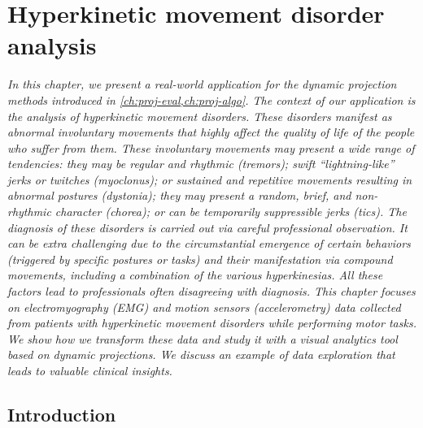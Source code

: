 \chapter{Hyperkinetic movement disorder analysis}
\label{ch:nemo}

\textit{
In this chapter, we present a real-world application for the dynamic projection methods introduced in \cref{ch:proj-eval,ch:proj-algo}. The context of our application is the analysis of hyperkinetic movement disorders. These disorders manifest as abnormal involuntary movements that highly affect the quality of life of the people who suffer from them. These involuntary movements may present a wide range of tendencies: they may be regular and rhythmic (tremors); swift ``lightning-like'' jerks or twitches (myoclonus); or sustained and repetitive movements resulting in abnormal postures (dystonia); they may present a random, brief, and non-rhythmic character (chorea); or can be temporarily suppressible jerks (tics). The diagnosis of these disorders is carried out via careful professional observation. It can be extra challenging due to the circumstantial emergence of certain behaviors (triggered by specific postures or tasks) and their manifestation via compound movements, including a combination of the various hyperkinesias. All these factors lead to professionals often disagreeing with diagnosis. 
This chapter focuses on electromyography (EMG) and motion sensors (accelerometry) data collected from patients with hyperkinetic movement disorders while performing motor tasks. We show how we transform these data and study it with a visual analytics tool based on dynamic projections. We discuss an example of data exploration that leads to valuable clinical insights.
}

\vspace{5mm} %



\section{Introduction}


